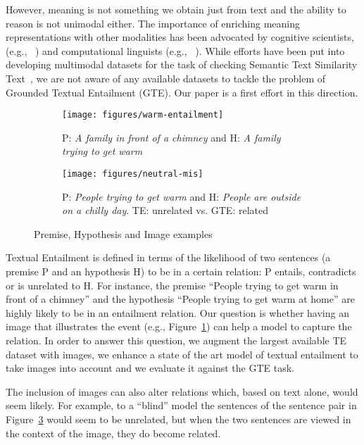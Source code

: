 \documentclass[11pt]{article}
\begin{document}
However, meaning is
not something we obtain just from text and the ability to reason is
not unimodal either. The importance of enriching meaning
representations with other modalities has been advocated by
cognitive scientists, (e.g., ~\cite{Andrews2009,Barsalou2010}) and computational linguists
(e.g., ~\cite{Glavas2017}).
While efforts have been put into developing multimodal
datasets for the task of checking Semantic Text Similarity Text~\cite{Agirre2017}, 
we are not aware of any available datasets to tackle the problem of
Grounded Textual Entailment (GTE). Our paper is a first effort in this
direction.


\begin{figure}
\centering
\begin{subfigure}[b]{0.45\textwidth}
		\centering
         \texttt{[image: figures/warm-entailment]}
          \caption{P: {\em A family in front of a chimney} and H: {\em A family
          trying to get warm}}
        \label{fig:ent}
    \end{subfigure}
\hfill
\begin{subfigure}[b]{0.45\textwidth}
		\centering
         \texttt{[image: figures/neutral-mis]}
        \caption{P: {\em People trying to get warm} and H: {\em People are outside on a
          chilly day}. TE: unrelated vs. GTE: related}
        \label{fig:neutral}
    \end{subfigure}
\caption{Premise, Hypothesis and Image examples}
\end{figure}

Textual Entailment is defined in terms of the likelihood of two
sentences (a premise P and an hypothesis H) to be in a certain
relation: P entails, contradicts or is unrelated to H. For instance,
the premise ``People trying to get warm in front of a chimney'' and
the hypothesis ``People trying to get warm at home'' are highly likely
to be in an entailment relation. Our question is 
whether having an image that
illustrates the event (e.g., Figure~\ref{fig:ent}) can help a model
to capture the relation. In order to answer this question, we augment the
largest available TE dataset with images, we enhance a state of the art
model of textual entailment to take images into account and we evaluate
it against the GTE task.

The inclusion of images can also alter relations which, based on text alone, would seem likely. For example, to a ``blind'' model the sentences of the sentence pair in Figure~\ref{fig:neutral} would seem to be unrelated, but
when the two sentences are viewed in the context of the image, they do become related.
\end{document}
